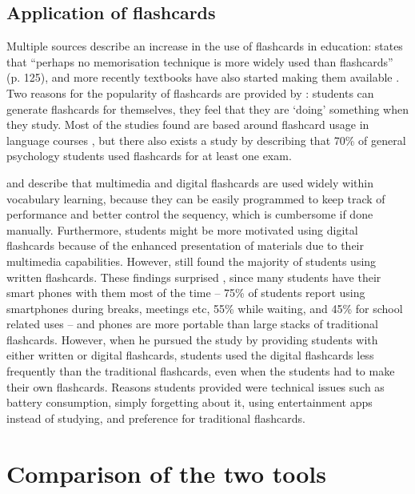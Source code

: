 
\subsection{Application of flashcards}

Multiple sources describe an increase in the use of flashcards in education:  states that ``perhaps no memorisation technique is more widely used than flashcards'' (p. 125), and more recently textbooks have also started making them available \cite{burgess, golding}. Two reasons for the popularity of flashcards are provided by : students can generate flashcards for themselves, they feel that they are `doing' something when they study. Most of the studies found are based around flashcard usage in language courses \cite{nakata, joseph, chien}, but there also exists a study by  describing that 70\% of general psychology students used flashcards for at least one exam.

 and  describe that multimedia and digital flashcards are used widely within vocabulary learning, because they can be easily programmed to keep track of performance and better control the sequency, which is cumbersome if done manually. Furthermore, students might be more motivated using digital flashcards because of the enhanced presentation of materials due to their multimedia capabilities. However,  still found the majority of students using written flashcards. These findings surprised , since many students have their smart phones with them most of the time -- 75\% of students report using smartphones during breaks, meetings etc, 55\% while waiting, and 45\% for school related uses -- and phones are more portable than large stacks of traditional flashcards. However, when he pursued the study by providing students with either written or digital flashcards, students used the digital flashcards less frequently than the traditional flashcards, even when the students had to make their own flashcards. Reasons students provided were technical issues such as battery consumption, simply forgetting about it, using entertainment apps instead of studying, and preference for traditional flashcards.

\section{Comparison of the two tools}


